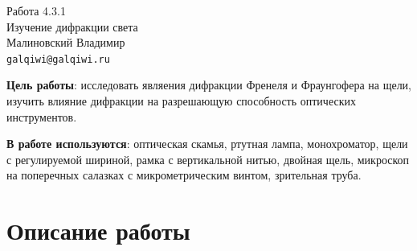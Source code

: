 
\usepackage{booktabs}
\usepackage{multirow}

\usepackage{wrapfig}



\begin{center}
  \LARGE{Работа 4.3.1}\\[0.2cm]
  \LARGE{Изучение дифракции света}\\[0.2cm]
  \large{Малиновский Владимир}\\[0.2cm]
  \normalsize{\texttt{galqiwi@galqiwi.ru}}
\end{center}

\textbf{Цель работы}: исследовать являения дифракции Френеля и Фраунгофера на щели, изучить влияние дифракции на разрешающую способность оптических инструментов.


\textbf{В работе используются}: оптическая скамья, ртутная лампа, монохроматор, щели с регулируемой шириной, рамка с вертикальной нитью, двойная щель, микроскоп на поперечных салазках с микрометрическим винтом, зрительная труба.
\section*{Описание работы}
